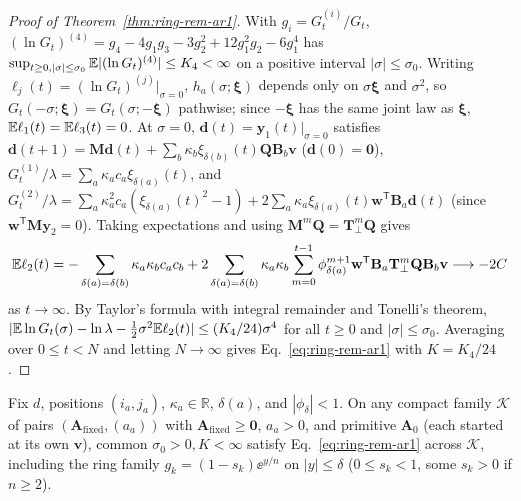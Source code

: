 \begin{proof}[Proof of Theorem~{\upshape\ref{thm:ring-rem-ar1}}]
With $g_i = G_t^{(i)}/G_t$, $(\ln G_t)^{(4)} = g_4 - 4g_1 g_3 - 3g_2^2 + 12g_1^2 g_2 - 6g_1^4$ has $\sup_{t \ge 0, |\sigma| \le \sigma_0} \mathbb{E}|(\ln G_t)^{(4)}| \le K_4 < \infty$ on a positive interval $|\sigma| \le \sigma_0$. Writing $\ell_j(t) = (\ln G_t)^{(j)}|_{\sigma=0}$, $h_a(\sigma; \boldsymbol{\xi})$ depends only on $\sigma\boldsymbol{\xi}$ and $\sigma^2$, so $G_t(-\sigma; \boldsymbol{\xi}) = G_t(\sigma; -\boldsymbol{\xi})$ pathwise; since $-\boldsymbol{\xi}$ has the same joint law as $\boldsymbol{\xi}$, $\mathbb{E}\ell_1(t) = \mathbb{E}\ell_3(t) = 0$. At $\sigma = 0$, $\mathbf{d}(t) = \mathbf{y}_1(t)|_{\sigma=0}$ satisfies $\mathbf{d}(t + 1) = \mathbf{M}\mathbf{d}(t) + \sum_b \kappa_b\xi_{\delta(b)}(t)\mathbf{Q}\mathbf{B}_b\mathbf{v}$ ($\mathbf{d}(0) = \mathbf{0}$), $G_t^{(1)}/\lambda = \sum_a \kappa_a c_a\xi_{\delta(a)}(t)$, and $G_t^{(2)}/\lambda = \sum_a \kappa_a^2 c_a(\xi_{\delta(a)}(t)^2 - 1) + 2\sum_a \kappa_a\xi_{\delta(a)}(t)\mathbf{w}^{\mathsf{T}}\mathbf{B}_a\mathbf{d}(t)$ (since $\mathbf{w}^{\mathsf{T}}\mathbf{M}\mathbf{y}_2 = 0$). Taking expectations and using $\mathbf{M}^m\mathbf{Q} = \mathbf{T}_\perp^m\mathbf{Q}$ gives
\[
\mathbb{E}\ell_2(t) = -\sum_{\delta(a)=\delta(b)} \kappa_a\kappa_b c_a c_b + 2\sum_{\delta(a)=\delta(b)} \kappa_a\kappa_b \sum_{m=0}^{t-1} \phi_{\delta(a)}^{m+1}\mathbf{w}^{\mathsf{T}}\mathbf{B}_a\mathbf{T}_\perp^m\mathbf{Q}\mathbf{B}_b\mathbf{v} \longrightarrow -2C
\]
as $t \to \infty$. By Taylor's formula with integral remainder and Tonelli's theorem, $|\mathbb{E}\ln G_t(\sigma) - \ln\lambda - \frac{1}{2}\sigma^2\mathbb{E}\ell_2(t)| \le (K_4/24)\sigma^4$ for all $t \ge 0$ and $|\sigma| \le \sigma_0$. Averaging over $0 \le t < N$ and letting $N \to \infty$ gives Eq.~\eqref{eq:ring-rem-ar1} with $K = K_4/24$.
\end{proof}

\begin{lemma}\label{lem:ring-rem-uniform}
Fix $d$, positions $(i_a, j_a)$, $\kappa_a \in \mathbb{R}$, $\delta(a)$, and $|\phi_\delta| < 1$. On any compact family $\mathcal{K}$ of pairs $(\mathbf{A}_{\mathrm{fixed}}, (a_a))$ with $\mathbf{A}_{\mathrm{fixed}} \ge \mathbf{0}$, $a_a > 0$, and primitive $\mathbf{A}_0$ (each started at its own $\mathbf{v}$), common $\sigma_0 > 0, K < \infty$ satisfy Eq.~\eqref{eq:ring-rem-ar1} across $\mathcal{K}$, including the ring family $g_k = (1 - s_k)\ee^{y/n}$ on $|y| \le \delta$ ($0 \le s_k < 1$, some $s_k > 0$ if $n \ge 2$).
\end{lemma}

